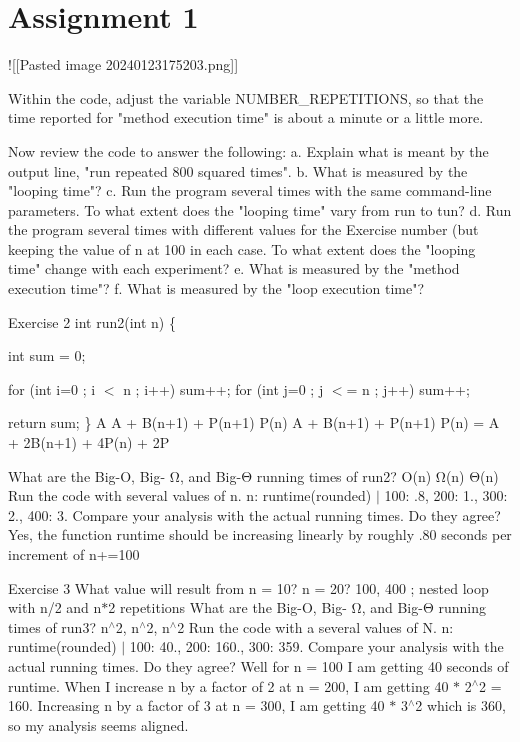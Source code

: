 \chapter{Assignment 1}
\hypertarget{md__assignment_011}{}\label{md__assignment_011}
!\mbox{[}\mbox{[}Pasted image 20240123175203.\+png\mbox{]}\mbox{]}

Within the code, adjust the variable NUMBER\+\_\+\+REPETITIONS, so that the time reported for "{}method execution time"{} is about a minute or a little more.

Now review the code to answer the following\+: a. Explain what is meant by the output line, "{}run repeated 800 squared times"{}. b. What is measured by the "{}looping time"{}? c. Run the program several times with the same command-\/line parameters. To what extent does the "{}looping time"{} vary from run to tun? d. Run the program several times with different values for the Exercise number (but keeping the value of n at 100 in each case. To what extent does the "{}looping time"{} change with each experiment? e. What is measured by the "{}method execution time"{}? f. What is measured by the "{}loop execution time"{}?

Exercise 2 int run2(int n) \{

int sum = 0;

for (int i=0 ; i \texorpdfstring{$<$}{<} n ; i++) sum++; for (int j=0 ; j \texorpdfstring{$<$}{<}= n ; j++) sum++;

return sum; \} A A + B(n+1) + P(n+1) P(n) A + B(n+1) + P(n+1) P(n) = A + 2B(n+1) + 4P(n) + 2P

What are the Big-\/O, Big-\/ Ω, and Big-\/Θ running times of run2? O(n) Ω(n) Θ(n) Run the code with several values of n. n\+: runtime(rounded) \texorpdfstring{$\vert$}{|} 100\+: .8, 200\+: 1., 300\+: 2., 400\+: 3. Compare your analysis with the actual running times. Do they agree? Yes, the function runtime should be increasing linearly by roughly .80 seconds per increment of n+=100

Exercise 3 What value will result from n = 10? n = 20? 100, 400 ; nested loop with n/2 and n\texorpdfstring{$\ast$}{*}2 repetitions What are the Big-\/O, Big-\/ Ω, and Big-\/Θ running times of run3? n\texorpdfstring{$^\wedge$}{\string^}2, n\texorpdfstring{$^\wedge$}{\string^}2, n\texorpdfstring{$^\wedge$}{\string^}2 Run the code with a several values of N. n\+: runtime(rounded) \texorpdfstring{$\vert$}{|} 100\+: 40., 200\+: 160., 300\+: 359. Compare your analysis with the actual running times. Do they agree? Well for n = 100 I am getting 40 seconds of runtime. When I increase n by a factor of 2 at n = 200, I am getting 40 \texorpdfstring{$\ast$}{*} 2\texorpdfstring{$^\wedge$}{\string^}2 = 160. Increasing n by a factor of 3 at n = 300, I am getting 40 \texorpdfstring{$\ast$}{*} 3\texorpdfstring{$^\wedge$}{\string^}2 which is 360, so my analysis seems aligned.

